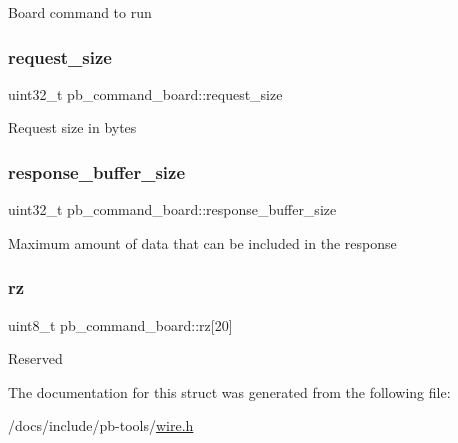 Board command to run \mbox{\label{structpb__command__board_a748f573d48c798718123eee30d4c6708}} 
\subsubsection{\texorpdfstring{request\+\_\+size}{request\_size}}
{\footnotesize\ttfamily uint32\+\_\+t pb\+\_\+command\+\_\+board\+::request\+\_\+size}

Request size in bytes \mbox{\label{structpb__command__board_a1257207ae1c927f6ad15b9d992847dba}} 
\subsubsection{\texorpdfstring{response\+\_\+buffer\+\_\+size}{response\_buffer\_size}}
{\footnotesize\ttfamily uint32\+\_\+t pb\+\_\+command\+\_\+board\+::response\+\_\+buffer\+\_\+size}

Maximum amount of data that can be included in the response \mbox{\label{structpb__command__board_a1b4c5932c2b9ea9eb359a0a7cb59d174}} 
\subsubsection{\texorpdfstring{rz}{rz}}
{\footnotesize\ttfamily uint8\+\_\+t pb\+\_\+command\+\_\+board\+::rz\mbox{[}20\mbox{]}}

Reserved 

The documentation for this struct was generated from the following file\+:\begin{DoxyCompactItemize}
\item 
/docs/include/pb-\/tools/\hyperlink{wire_8h}{wire.\+h}\end{DoxyCompactItemize}
